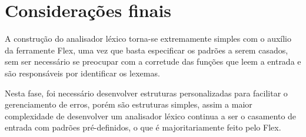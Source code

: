 \documentclass[
	article,			%
	11pt,				%
	oneside,			%
	a4paper,			%
	english,			%
	brazil,				%
	sumario=tradicional
	]{abntex2}
\begin{document}
\section{Considerações finais}

A construção do analisador léxico torna-se extremamente simples com
o auxílio da ferramente Flex, uma vez que basta especificar os padrões
a serem casados, sem ser necessário se preocupar com a corretude
das funções que leem a entrada e são responsáveis por identificar
os lexemas.

Nesta fase, foi necessário desenvolver estruturas personalizadas
para facilitar o gerenciamento de erros, porém são estruturas simples,
assim a maior complexidade de desenvolver um analisador léxico
continua a ser o casamento de entrada com padrões pré-definidos, o que
é majoritariamente feito pelo Flex.

% 

\postextual



%
%




\end{document}

